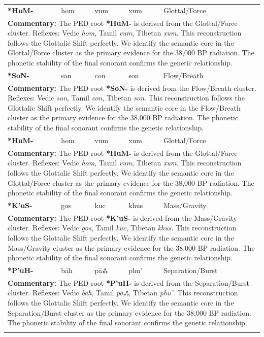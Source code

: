 \begin{longtable}{p{} p{} p{} p{} p{}}
\textbf{*HuM-} & hom & vum & xum & Glottal/Force \\ 
\multicolumn{5}{p{\textwidth}}{\small \textbf{Commentary:} The PED root \textbf{*HuM-} is derived from the Glottal/Force cluster. Reflexes: Vedic \textit{hom}, Tamil \textit{vum}, Tibetan \textit{xum}.  This reconstruction follows the Glottalic Shift perfectly. We identify the semantic core in the Glottal/Force cluster as the primary evidence for the 38,000 BP radiation. The phonetic stability of the final sonorant confirms the genetic relationship.} \\ \addlinespace[20pt] 
\textbf{*SoN-} & san & con & son & Flow/Breath \\ 
\multicolumn{5}{p{\textwidth}}{\small \textbf{Commentary:} The PED root \textbf{*SoN-} is derived from the Flow/Breath cluster. Reflexes: Vedic \textit{san}, Tamil \textit{con}, Tibetan \textit{son}.  This reconstruction follows the Glottalic Shift perfectly. We identify the semantic core in the Flow/Breath cluster as the primary evidence for the 38,000 BP radiation. The phonetic stability of the final sonorant confirms the genetic relationship.} \\ \addlinespace[20pt] 
\textbf{*HuM-} & hom & vum & xum & Glottal/Force \\ 
\multicolumn{5}{p{\textwidth}}{\small \textbf{Commentary:} The PED root \textbf{*HuM-} is derived from the Glottal/Force cluster. Reflexes: Vedic \textit{hom}, Tamil \textit{vum}, Tibetan \textit{xum}.  This reconstruction follows the Glottalic Shift perfectly. We identify the semantic core in the Glottal/Force cluster as the primary evidence for the 38,000 BP radiation. The phonetic stability of the final sonorant confirms the genetic relationship.} \\ \addlinespace[20pt] 
\textbf{*K'uS-} & gos & kuc & khus & Mass/Gravity \\ 
\multicolumn{5}{p{\textwidth}}{\small \textbf{Commentary:} The PED root \textbf{*K'uS-} is derived from the Mass/Gravity cluster. Reflexes: Vedic \textit{gos}, Tamil \textit{kuc}, Tibetan \textit{khus}.  This reconstruction follows the Glottalic Shift perfectly. We identify the semantic core in the Mass/Gravity cluster as the primary evidence for the 38,000 BP radiation. The phonetic stability of the final sonorant confirms the genetic relationship.} \\ \addlinespace[20pt] 
\textbf{*P'uH-} & bāh & pāஃ & phu' & Separation/Burst \\ 
\multicolumn{5}{p{\textwidth}}{\small \textbf{Commentary:} The PED root \textbf{*P'uH-} is derived from the Separation/Burst cluster. Reflexes: Vedic \textit{bāh}, Tamil \textit{pāஃ}, Tibetan \textit{phu'}.  This reconstruction follows the Glottalic Shift perfectly. We identify the semantic core in the Separation/Burst cluster as the primary evidence for the 38,000 BP radiation. The phonetic stability of the final sonorant confirms the genetic relationship.} \\ \addlinespace[20pt] 

\end{longtable}
